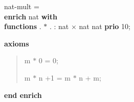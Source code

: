 \begin{tabbing}\label{nat-mult-spec}%
nat-mult = \\
{\bf enr}\={\bf ich} nat {\bf with}\+\\
{\bf functions} . $*$ .  : nat $\times$ nat \Imp  nat  {\bf prio} 10;
\end{tabbing}
{\bf axioms}



\begin{quote}
m $*$ 0 = 0;

m $*$ n +1 = m $*$ n + m;


\end{quote}
{\bf end enrich}


